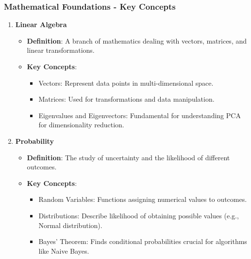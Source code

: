 \documentclass[aspectratio=169]{beamer}
\begin{document}
\begin{frame}[fragile]
    \frametitle{Mathematical Foundations - Key Concepts}
    \begin{enumerate}
        \item \textbf{Linear Algebra}
        \begin{itemize}
            \item \textbf{Definition}: A branch of mathematics dealing with vectors, matrices, and linear transformations.
            \item \textbf{Key Concepts}:
                \begin{itemize}
                    \item Vectors: Represent data points in multi-dimensional space.
                    \item Matrices: Used for transformations and data manipulation.
                    \item Eigenvalues and Eigenvectors: Fundamental for understanding PCA for dimensionality reduction.
                \end{itemize}
        \end{itemize}
        
        \item \textbf{Probability}
        \begin{itemize}
            \item \textbf{Definition}: The study of uncertainty and the likelihood of different outcomes.
            \item \textbf{Key Concepts}:
                \begin{itemize}
                    \item Random Variables: Functions assigning numerical values to outcomes.
                    \item Distributions: Describe likelihood of obtaining possible values (e.g., Normal distribution).
                    \item Bayes' Theorem: Finds conditional probabilities crucial for algorithms like Naive Bayes.
                \end{itemize}
        \end{itemize}


\end{enumerate}
\end{frame}
\end{document}
